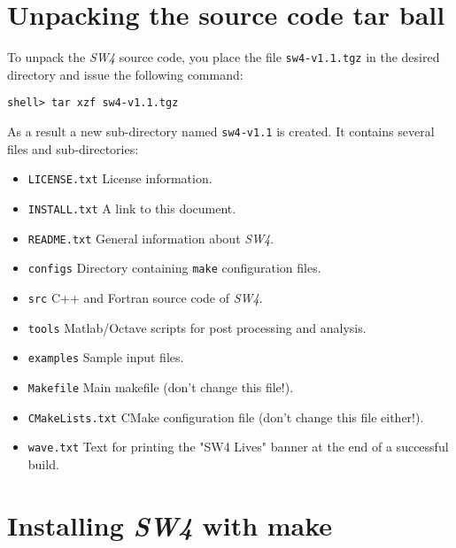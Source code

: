 \documentclass[11pt]{article}
\begin{document}
\section{Unpacking the source code tar ball}

To unpack the \emph{SW4} source code, you place the file \verb+sw4-v1.1.tgz+ in the
desired directory and issue the following command:
\begin{verbatim}
shell> tar xzf sw4-v1.1.tgz
\end{verbatim}
As a result a new sub-directory named \verb+sw4-v1.1+ is created. It contains several files
and sub-directories:
%
\begin{itemize}
\item \verb+LICENSE.txt+ License information.
\item \verb+INSTALL.txt+ A link to this document.
\item \verb+README.txt+ General information about \emph{SW4}.
\item \verb+configs+ Directory containing \verb+make+ configuration files.
\item \verb+src+ C++ and Fortran source code of \emph{SW4}.
\item \verb+tools+ Matlab/Octave scripts for post processing and analysis.
\item \verb+examples+ Sample input files.
\item \verb+Makefile+ Main makefile (don't change this file!).
\item \verb+CMakeLists.txt+ CMake configuration file (don't change this file either!).
\item \verb+wave.txt+ Text for printing the "SW4 Lives" banner at the end of a successful build.
\end{itemize}

\section{Installing \emph{SW4} with make}\label{cha:installing-sw4}

\end{document}
